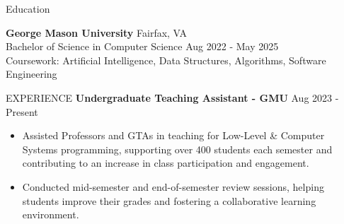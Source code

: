 \documentclass{resume} %
\begin{document}
\vspace{-0.5em}
\begin{rSection}{Education}

{\bf George Mason University} \hfill {Fairfax, VA}\\
Bachelor of Science in Computer Science \hfill{Aug 2022 - May 2025}\\
Coursework: Artificial Intelligence, Data Structures, Algorithms, Software Engineering\\
\end{rSection}

\begin{rSection}{EXPERIENCE}
\textbf{Undergraduate Teaching Assistant - GMU} \hfill Aug 2023 - Present
 \begin{itemize}
    \itemsep -3pt {}
     \item Assisted Professors and GTAs in teaching for Low-Level \& Computer Systems programming, supporting over 400 students each semester and contributing to an increase in class participation and engagement.
     \item Conducted mid-semester and end-of-semester review sessions, helping students improve their grades and fostering a collaborative learning environment.
 \end{itemize}

\end{rSection} 
\end{document}
